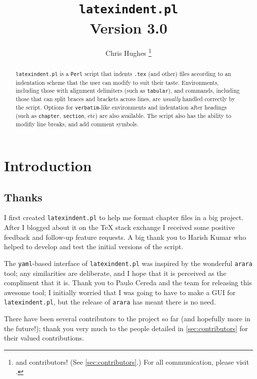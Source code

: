 \documentclass[8pt]{article}
\begin{document}
	\title{\lstinline[basicstyle=\huge\ttfamily]!latexindent.pl!\\[1cm]
		Version 3.0}
\author{Chris Hughes \footnote{and contributors! (See \vref{sec:contributors}.) For
		all communication, please visit \cite{latexindent-home}.}}
\maketitle
\begin{abstract}
	\texttt{latexindent.pl} is a \texttt{Perl} script that indents \texttt{.tex} (and other)
	files according to an indentation scheme that the user can modify to suit their
	taste. Environments, including those with alignment delimiters (such as \texttt{tabular}),
	and commands, including those that can split braces and brackets across lines,
	are \emph{usually} handled correctly by the script. Options for \texttt{verbatim}-like
	environments and indentation after headings (such as \lstinline!chapter!, \lstinline!section!, etc)
	are also available. The script also has the ability to modifiy line breaks, and add
	comment symbols.
\end{abstract}
\tableofcontents
\lstlistoflistings

\section{Introduction}
\subsection{Thanks}
I first created \texttt{latexindent.pl} to help me format chapter files
in a big project. After I blogged about it on the
\TeX{} stack exchange \cite{cmhblog} I received some positive feedback and
follow-up feature requests. A big thank you to Harish Kumar who
helped to develop and test the initial versions of the script.

The \texttt{yaml}-based interface of \texttt{latexindent.pl} was inspired
by the wonderful \texttt{arara} tool; any similarities are deliberate, and
I hope that it is perceived as the compliment that it is. Thank you to Paulo Cereda and the
team for releasing this awesome tool; I initially worried that I was going to
have to make a GUI for \texttt{latexindent.pl}, but the release of \texttt{arara}
has meant there is no need.

There have been several contributors to the project so far (and hopefully more in
the future!); thank you very much to the people detailed in \vref{sec:contributors}
for their valued contributions.
\end{document}
